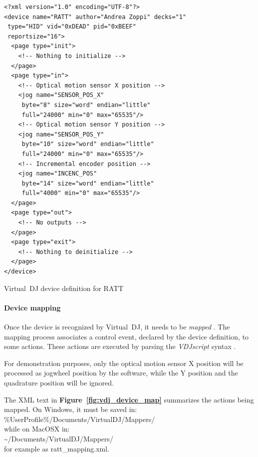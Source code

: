 \documentclass[a4paper,10pt]{article}
\makeatletter
\newenvironment{figurehere}{\def\@captype{figure}\vspace{2ex}}{\vspace{2ex}}
\newcommand{\citef}[1]{\textbf{Figure~\ref{#1}}}
\makeatother
\begin{document}
\begin{multicols}{2}
\begin{figurehere}
\begin{mdframed}[
	innerleftmargin=4pt,
	innerrightmargin=4pt,
	innertopmargin=0pt,
	innerbottommargin=0pt
]
\begin{lstlisting}[language=simpleXML]
<?xml version="1.0" encoding="UTF-8"?>
<device name="RATT" author="Andrea Zoppi" decks="1"
 type="HID" vid="0xDEAD" pid="0xBEEF"
 reportsize="16">
  <page type="init">
    <!-- Nothing to initialize -->
  </page>
  <page type="in">
    <!-- Optical motion sensor X position -->
    <jog name="SENSOR_POS_X"
     byte="8" size="word" endian="little"
     full="24000" min="0" max="65535"/>
    <!-- Optical motion sensor Y position -->
    <jog name="SENSOR_POS_Y"
     byte="10" size="word" endian="little"
     full="24000" min="0" max="65535"/>
    <!-- Incremental encoder position -->
    <jog name="INCENC_POS"
     byte="14" size="word" endian="little"
     full="4000" min="0" max="65535"/>
  </page>
  <page type="out">
    <!-- No outputs -->
  </page>
  <page type="exit">
    <!-- Nothing to deinitialize -->
  </page>
</device>
\end{lstlisting}
\end{mdframed}
\caption{Virtual~DJ device definition for RATT}
\label{fig:vdj_device_def}
\end{figurehere}


\paragraph{Device mapping}
Once the device is recognized by Virtual~DJ, it needs to be \emph{mapped}
\cite{vdj_mapping}. The mapping process associates a control event, declared
by the device definition, to some actions. These actions are executed by
parsing the \emph{VDJscript} syntax \cite{vdj_script}.

For demonstration purposes, only the optical motion sensor X position will be
processed as jogwheel position by the software, while the Y position and the
quadrature position will be ignored.

The XML text in \citef{fig:vdj_device_map} summarizes the actions being
mapped. On Windows, it must be saved in:\\
{\ttfamily\small {\%}UserProfile{\%}/Documents/VirtualDJ/Mappers/}\\
while on MacOSX in:\\
{\ttfamily\small {\textasciitilde}/Documents/VirtualDJ/Mappers/}\\
for example as {\ttfamily\small ratt{\_}mapping.xml}.


\end{multicols}
\end{document}
